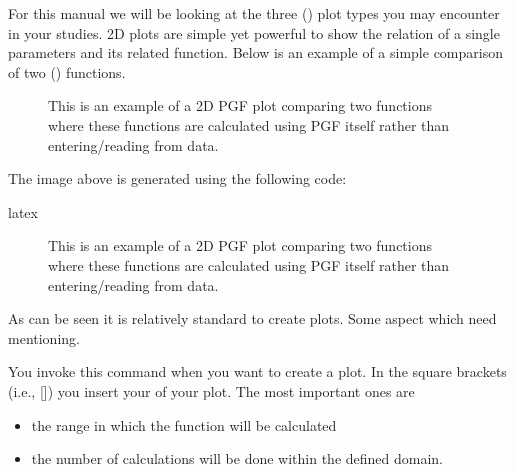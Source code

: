 \documentclass[minted, draw]{../tex/hebdomon}
\begin{document}
For this manual we will be looking at the three () plot types you may
encounter in your studies.
%
%
2D plots are simple yet powerful to show the relation of a single parameters
and its related function.
Below is an example of a simple comparison of two () functions.
%
\begin{figure}[!ht]
	\centering
	\caption{This is an example of a 2D PGF plot comparing
		two functions where these functions are calculated using
		PGF itself rather than entering/reading from data.}
\end{figure}
%
The image above is generated using the following code:

\begin{code}{latex}
\begin{figure}[!ht]
  \centering
  \caption{This is an example of a 2D PGF plot comparing
  two functions where these functions are calculated using
  PGF itself rather than entering/reading from data.}
\end{figure}
\end{code}

As can be seen it is relatively standard to create plots. Some aspect
which need mentioning.

\begin{hgitemize}
	\item[\pcode{\addplot}] You invoke this command when you want to
	create a plot. In the square brackets (i.e., []) you insert your
	 of your plot. The most important ones are
	\begin{itemize}
		\item[\pcode{domain}] the range in which the function will be
		      calculated
		\item[\pcode{sample}] the number of calculations will be done
		      within the defined domain.
	\end{itemize}
\end{hgitemize}
\end{document}
